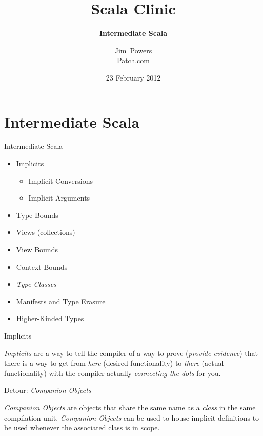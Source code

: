 \documentclass[14pt,t,usepdftitle=false,xcolornames=x11names,svgnames,dvipsnames,usenames]{beamer}
\newcommand{\wackyFont}[1]{
  {\LARGE\fontspec[Mapping=tex-text]{Trebuchet MS} #1}}
\newcommand{\hilight}[1]{
  {\textcolor{hilite}{\emph{#1}}}}
\newcommand{\subtitleFont}[1]{{\footnotesize #1}}
\begin{document}
\title{\wackyFont{Scala Clinic}}
\subtitle{\textbf{Intermediate Scala}}
\author{Jim~Powers\\\subtitleFont{Patch.com}}
\date{\subtitleFont{23 February 2012}}

\maketitle

\section{Intermediate Scala}

\begin{frame}{Intermediate Scala}
  \begin{itemize}[<+->]
    \item Implicits
    \begin{itemize}
      \item Implicit Conversions
      \item Implicit Arguments
    \end{itemize}
    \item Type Bounds
    \item Views (collections)
    \item View Bounds
    \item Context Bounds
    \item \hilight{Type Classes}
    \item Manifests and Type Erasure
    \item Higher-Kinded Types
  \end{itemize}
\end{frame}

\begin{frame}{Implicits}
  \hilight{Implicits} are a way to tell the compiler of a way to prove (\emph{provide evidence}) that there is a way to get from \emph{here} (desired functionality) to \emph{there} (actual functionality) with the compiler actually \emph{connecting the dots} for you.
\end{frame}

\begin{frame}{Detour: \emph{Companion Objects}}
  \hilight{Companion Objects} are objects that share the same name as a \emph{class} in the same compilation unit.  \emph{Companion Objects} can be used to house implicit definitions to be used whenever the associated class is in scope.
\end{frame}
\end{document}
